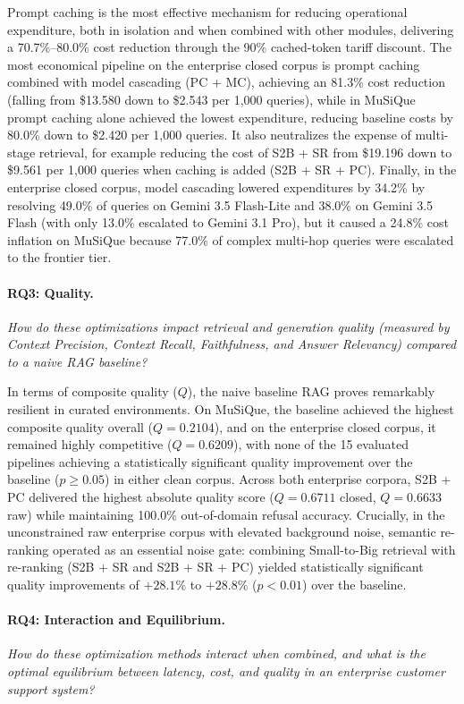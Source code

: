 Prompt caching is the most effective mechanism for reducing operational expenditure, both in isolation and when combined with other modules, delivering a 70.7\%--80.0\% cost reduction through the 90\% cached-token tariff discount. The most economical pipeline on the enterprise closed corpus is prompt caching combined with model cascading (PC + MC), achieving an 81.3\% cost reduction (falling from \$13.580 down to \$2.543 per 1,000 queries), while in MuSiQue prompt caching alone achieved the lowest expenditure, reducing baseline costs by 80.0\% down to \$2.420 per 1,000 queries. It also neutralizes the expense of multi-stage retrieval, for example reducing the cost of S2B + SR from \$19.196 down to \$9.561 per 1,000 queries when caching is added (S2B + SR + PC). Finally, in the enterprise closed corpus, model cascading lowered expenditures by 34.2\% by resolving 49.0\% of queries on Gemini 3.5 Flash-Lite and 38.0\% on Gemini 3.5 Flash (with only 13.0\% escalated to Gemini 3.1 Pro), but it caused a 24.8\% cost inflation on MuSiQue because 77.0\% of complex multi-hop queries were escalated to the frontier tier.

\paragraph{RQ3: Quality.} \textit{How do these optimizations impact retrieval and generation quality (measured by Context Precision, Context Recall, Faithfulness, and Answer Relevancy) compared to a naive RAG baseline?}

In terms of composite quality ($Q$), the naive baseline RAG proves remarkably resilient in curated environments. On MuSiQue, the baseline achieved the highest composite quality overall ($Q = 0.2104$), and on the enterprise closed corpus, it remained highly competitive ($Q = 0.6209$), with none of the 15 evaluated pipelines achieving a statistically significant quality improvement over the baseline ($p \ge 0.05$) in either clean corpus. Across both enterprise corpora, S2B + PC delivered the highest absolute quality score ($Q = 0.6711$ closed, $Q = 0.6633$ raw) while maintaining 100.0\% out-of-domain refusal accuracy. Crucially, in the unconstrained raw enterprise corpus with elevated background noise, semantic re-ranking operated as an essential noise gate: combining Small-to-Big retrieval with re-ranking (S2B + SR and S2B + SR + PC) yielded statistically significant quality improvements of $+28.1\%$ to $+28.8\%$ ($p < 0.01$) over the baseline. 

\paragraph{RQ4: Interaction and Equilibrium.} \textit{How do these optimization methods interact when combined, and what is the optimal equilibrium between latency, cost, and quality in an enterprise customer support system?}

